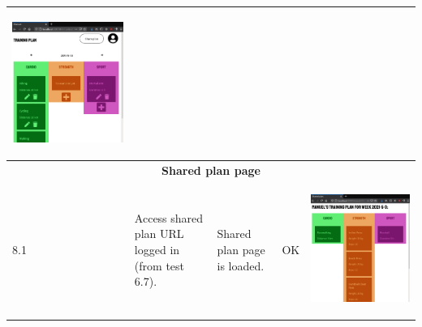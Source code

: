 \documentclass[12pt,twoside,titlepage,a4paper]{article}
\theoremstyle{definicion}
\theoremstyle{lema}
\theoremstyle{teorema}
\theoremstyle{corolario}
\theoremstyle{ejemplo}
\theoremstyle{nota}
\begin{document}
\begin{table}[!h]
\begin{tabular}{|m{0.6cm}|m{2.9cm}|m{3.6cm}|m{1.1cm}|m{5.9cm}|}
		\begin{center}\includegraphics[scale=0.18]{newplan5.png}\end{center} \\
		\hline
		\multicolumn{5}{|c|}{\textbf{Shared plan page}} \\ 
		\hline
		8.1 & Access shared plan URL logged in (from test 6.7). & Shared plan page is loaded. & OK & 
		\begin{center}\includegraphics[scale=0.18]{shared1.png}\end{center} \\

\end{tabular}
\end{table}
\end{document}

